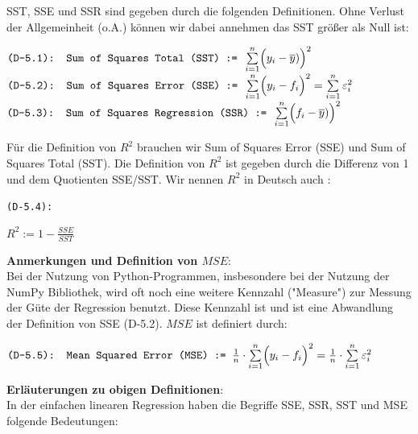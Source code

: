 \documentclass[12pt]{article}
\begin{document}
%
SST, SSE und SSR sind gegeben durch die folgenden Definitionen. Ohne Verlust der Allgemeinheit (o.A.) können wir dabei annehmen das SST größer als Null ist:
\begin{center}
$ \texttt{(D-5.1): Sum of Squares Total (SST) := } \sum\limits_{i=1}^n \Bigl(y_i - \overline{y})\Bigr)^2 $ 
$ \texttt{(D-5.2): Sum of Squares Error (SSE) := } \sum\limits_{i=1}^n \Bigl(y_i - f_i\Bigr)^2 = \sum\limits_{i=1}^n \varepsilon_i^2 $ 
$ \texttt{(D-5.3): Sum of Squares Regression (SSR) := } \sum\limits_{i=1}^n \Bigl(f_i - \overline{y})\Bigr)^2 $  
\end{center}
Für die Definition von $R^2$ brauchen wir Sum of Squares Error (SSE) und Sum of Squares Total (SST). Die Definition von $R^2$ ist gegeben durch die Differenz von 1 und dem Quotienten SSE/SST. Wir nennen $R^2$ in Deutsch auch {\color{blue}{"Bestimmtheitsgmaß"}}: \\
\begin{center}
\texttt{(D-5.4):}
\begin{Large}  
\textbf{$ R^2 := 1 - \frac{SSE}{SST} $} \\[0.8cm]
\end{Large}   
\end{center}
% 
\textbf{Anmerkungen und Definition von $MSE$}:\\[0.2cm]
Bei der Nutzung von Python-Programmen, insbesondere bei der Nutzung der NumPy Bibliothek, wird oft noch eine weitere Kennzahl ("Measure") zur Messung der Güte der Regression benutzt. Diese Kennzahl ist  {\color{blue}{"Mean Squared Error" $(MSE)$}}  und ist eine Abwandlung der Definition von SSE (D-5.2). $ MSE$ ist definiert durch:
\begin{center}
$ \texttt{(D-5.5): Mean Squared Error (MSE) := } \frac{1}{n} \cdot \sum\limits_{i=1}^n \Bigl( y_i - f_i \Bigr)^2 = \frac{1}{n} \cdot \sum\limits_{i=1}^n \varepsilon_i^2 $ \\
\end{center} 
%
\textbf{Erläuterungen zu obigen Definitionen}:\\[0.3 cm]
%
In der einfachen linearen Regression haben die Begriffe SSE, SSR, SST und MSE folgende Bedeutungen:
\end{document}
